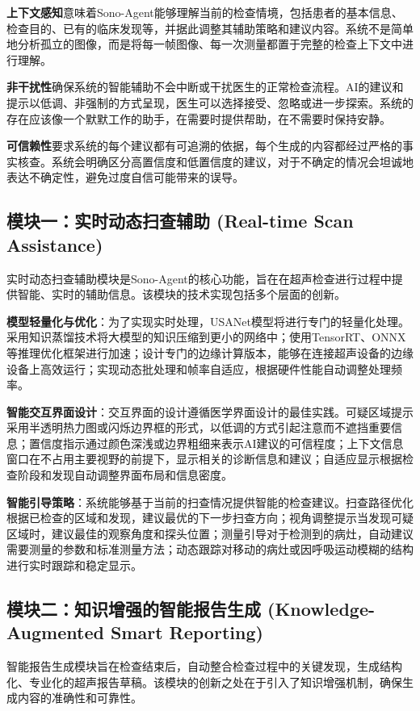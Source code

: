 \textbf{上下文感知}意味着Sono-Agent能够理解当前的检查情境，包括患者的基本信息、检查目的、已有的临床发现等，并据此调整其辅助策略和建议内容。系统不是简单地分析孤立的图像，而是将每一帧图像、每一次测量都置于完整的检查上下文中进行理解。

\textbf{非干扰性}确保系统的智能辅助不会中断或干扰医生的正常检查流程。AI的建议和提示以低调、非强制的方式呈现，医生可以选择接受、忽略或进一步探索。系统的存在应该像一个默默工作的助手，在需要时提供帮助，在不需要时保持安静。

\textbf{可信赖性}要求系统的每个建议都有可追溯的依据，每个生成的内容都经过严格的事实核查。系统会明确区分高置信度和低置信度的建议，对于不确定的情况会坦诚地表达不确定性，避免过度自信可能带来的误导。

\subsection{模块一：实时动态扫查辅助 (Real-time Scan Assistance)}

实时动态扫查辅助模块是Sono-Agent的核心功能，旨在在超声检查进行过程中提供智能、实时的辅助信息。该模块的技术实现包括多个层面的创新。

\textbf{模型轻量化与优化}：为了实现实时处理，USANet模型将进行专门的轻量化处理。采用知识蒸馏技术将大模型的知识压缩到更小的网络中；使用TensorRT、ONNX等推理优化框架进行加速；设计专门的边缘计算版本，能够在连接超声设备的边缘设备上高效运行；实现动态批处理和帧率自适应，根据硬件性能自动调整处理频率。

\textbf{智能交互界面设计}：交互界面的设计遵循医学界面设计的最佳实践。可疑区域提示采用半透明热力图或闪烁边界框的形式，以低调的方式引起注意而不遮挡重要信息；置信度指示通过颜色深浅或边界粗细来表示AI建议的可信程度；上下文信息窗口在不占用主要视野的前提下，显示相关的诊断信息和建议；自适应显示根据检查阶段和发现自动调整界面布局和信息密度。

\textbf{智能引导策略}：系统能够基于当前的扫查情况提供智能的检查建议。扫查路径优化根据已检查的区域和发现，建议最优的下一步扫查方向；视角调整提示当发现可疑区域时，建议最佳的观察角度和探头位置；测量引导对于检测到的病灶，自动建议需要测量的参数和标准测量方法；动态跟踪对移动的病灶或因呼吸运动模糊的结构进行实时跟踪和稳定显示。

\subsection{模块二：知识增强的智能报告生成 (Knowledge-Augmented Smart Reporting)}

智能报告生成模块旨在检查结束后，自动整合检查过程中的关键发现，生成结构化、专业化的超声报告草稿。该模块的创新之处在于引入了知识增强机制，确保生成内容的准确性和可靠性。

